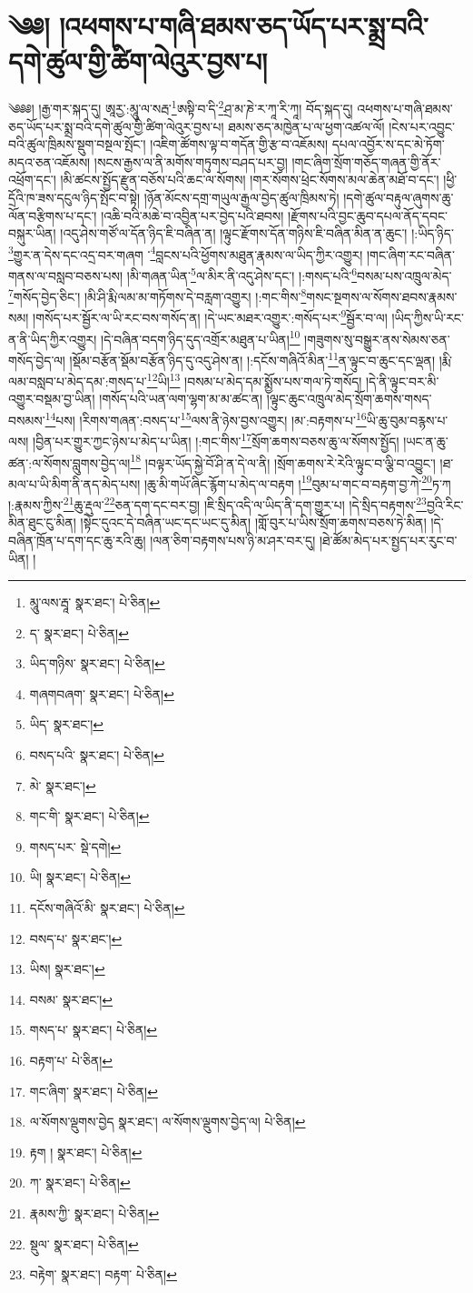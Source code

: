 \setcounter{footnote}{0} 
\chapter{༄༅། །འཕགས་པ་གཞི་ཐམས་ཅད་ཡོད་པར་སྨྲ་བའི་དགེ་ཚུལ་གྱི་ཚིག་ལེའུར་བྱས་པ།}༄༅༅། །རྒྱ་གར་སྐད་དུ། ཨཱརྱ་:མཱུ་ལ་སརྦ་\footnote{མཱུ་ལས་རྦཱ་  སྣར་ཐང་།  པེ་ཅིན། }ཨསྟི་བ་དི་\footnote{ད་  སྣར་ཐང་།  པེ་ཅིན། }ཤྲ་མ་ཎེ་ར་ཀཱ་རི་ཀཱ། བོད་སྐད་དུ། འཕགས་པ་གཞི་ཐམས་ཅད་ཡོད་པར་སྨྲ་བའི་དགེ་ཚུལ་གྱི་ཚིག་ལེའུར་བྱས་པ། ཐམས་ཅད་མཁྱེན་པ་ལ་ཕྱག་འཚལ་ལོ། །ངེས་པར་འབྱུང་བའི་ཚུལ་ཁྲིམས་སྡུག་བསྔལ་སྤོང་། །འཇིག་ཚོགས་ལྟ་བ་གདོན་གྱི་རྩ་བ་འཇོམས། དཔལ་འབྱོར་ས་དང་མེ་ཏོག་མདའ་ཅན་འཇོམས། །སངས་རྒྱས་ལ་ནི་མགོས་གཏུགས་བཤད་པར་བྱ། །གང་ཞིག་སྲོག་གཅོད་གཞན་གྱི་ནོར་འཕྲོག་དང་། །མི་ཚངས་སྤྱོད་རྫུན་བཅོས་པའི་ཆང་ལ་སོགས། །གར་སོགས་ཕྲེང་སོགས་མལ་ཆེན་མཐོ་བ་དང་། །ཕྱི་དྲོའི་ཁ་ཟས་དངུལ་ཉིད་སྤོང་བ་སྟེ། །ཉོན་མོངས་དགྲ་གཡུལ་རྒྱལ་བྱེད་ཚུལ་ཁྲིམས་ཏེ། །དགེ་ཚུལ་བརྟུལ་ཞུགས་ཆུ་ལོན་བརྩིགས་པ་དང་། །འཆི་བའི་མཆེ་བ་འབྱིན་པར་བྱེད་པའི་ཐབས། །རྫོགས་པའི་བྱང་ཆུབ་དཔལ་ནོད་དབང་བསྐུར་ཡིན། །འདུ་ཤེས་གཙོ་ལ་དོན་ཉིད་ཇི་བཞིན་ན། །ལྟུང་རྫོགས་དོན་གཉིས་ཇི་བཞིན་མིན་ན་ཆུང་། །:ཡིད་ཉིད་\footnote{ཡིད་གཉིས་  སྣར་ཐང་།  པེ་ཅིན། }གྱུར་ན་དེས་དང་འདྲ་བར་གཞག ་\footnote{གཞགབཞག་  སྣར་ཐང་།  པེ་ཅིན། }བླངས་པའི་ཕྱོགས་མཐུན་རྣམས་ལ་ཡིད་ཀྱིར་འགྱུར། །གང་ཞིག་རང་བཞིན་གནས་ལ་བསླབ་བཅས་པས། །མི་གཞན་ཡིན་\footnote{ཡིད་  སྣར་ཐང་། }ལ་མིར་ནི་འདུ་ཤེས་དང་། །:གསད་པའི་\footnote{བསད་པའི་  སྣར་ཐང་།  པེ་ཅིན། }བསམ་པས་འཁྲུལ་མེད་\footnote{མེ་  སྣར་ཐང་། }གསོད་བྱེད་ཅིང་། །མི་ཤི་རྨི་ལམ་མ་གཏོགས་དེ་བརླག་འགྱུར། །:གང་གིས་\footnote{གང་གི་  སྣར་ཐང་།  པེ་ཅིན། }གསང་སྔགས་ལ་སོགས་ཐབས་རྣམས་སམ། །གསོད་པར་སྦྱོར་ལ་ཡི་རང་བས་གསོད་ན། །དེ་ཡང་མཐར་འགྱུར་:གསོད་པར་\footnote{གསད་པར་  སྡེ་དགེ། }སྦྱོར་བ་ལ། །ཡིད་ཀྱིས་ཡི་རང་ན་ནི་ཡིད་ཀྱིར་འགྱུར། །དེ་བཞིན་བདག་ཉིད་དུད་འགྲོར་མཐུན་པ་ཡིན།\footnote{ཡི།  སྣར་ཐང་།  པེ་ཅིན། } །གཟུགས་སུ་བསྒྱུར་ནས་སེམས་ཅན་གསོད་བྱེད་ལ། །སྡོམ་བརྩོན་སྡོམ་བརྩོན་ཉིད་དུ་འདུ་ཤེས་ན། །:དངོས་གཞིའོ་མིན་\footnote{དངོས་གཞིའོ་མི་  སྣར་ཐང་།  པེ་ཅིན། }ན་ལྟུང་བ་ཆུང་དང་ལྡན། །རྨི་ལམ་བསླབ་པ་མེད་དམ་:གསད་པ་\footnote{བསད་པ་  སྣར་ཐང་། }ཡི།\footnote{ཡིས།  སྣར་ཐང་། } །བསམ་པ་མེད་དམ་སྨྱོས་པས་གལ་ཏེ་གསོད། །དེ་ནི་ལྟུང་བར་མི་འགྱུར་བསྡམ་བྱ་ཡིན། །གསོད་པའི་ཡན་ལག་ལྷག་མ་མ་ཚང་ན། །ལྟུང་ཆུང་འཁྲུལ་མེད་སྲོག་ཆགས་གསད་བསམས་\footnote{བསམ་  སྣར་ཐང་། }པས། །རིགས་གཞན་:བསད་པ་\footnote{གསད་པ་  སྣར་ཐང་།  པེ་ཅིན། }ལས་ནི་ཉེས་བྱས་འགྱུར། །མ་:བརྟགས་པ་\footnote{བརྟག་པ་  པེ་ཅིན། }ཡི་ཆུ་བུམ་བརྙས་པ་ལས། །བྱིན་པར་གྱུར་ཀྱང་ཉེས་པ་མེད་པ་ཡིན། །:གང་གིས་\footnote{གང་ཞིག་  སྣར་ཐང་།  པེ་ཅིན། }སྲོག་ཆགས་བཅས་ཆུ་ལ་སོགས་སྤྱོད། །ཡང་ན་ཆུ་ཚན་:ལ་སོགས་བླུགས་བྱེད་ལ།\footnote{ལ་སོགས་ལྡུགས་བྱེད  སྣར་ཐང་། ལ་སོགས་ལྡུགས་བྱེད་ལ།  པེ་ཅིན། } །བལྟར་ཡོད་སྐྱེ་བོ་ཤི་ན་དེ་ལ་ནི། །སྲོག་ཆགས་རེ་རེའི་ལྟུང་བ་ལྕི་བ་འབྱུང་། །ཐ་མལ་པ་ཡི་མིག་ནི་ནད་མེད་པས། །ཆུ་མི་གཡོ་ཞིང་རྙོག་པ་མེད་ལ་བརྟག །\footnote{རྟག །  སྣར་ཐང་།  པེ་ཅིན། }བུམ་པ་གང་བ་བརྟག་བྱ་ཀེ་\footnote{ཀ་  སྣར་ཐང་།  པེ་ཅིན། }ཏ་ཀ །:རྣམས་ཀྱིས་\footnote{རྣམས་ཀྱི་  སྣར་ཐང་།  པེ་ཅིན། }ཆུ་རྡུལ་\footnote{སྡུལ་  སྣར་ཐང་།  པེ་ཅིན། }ཅན་དག་དང་བར་བྱ། །ཇི་སྲིད་འདི་ལ་ཡིད་ནི་དག་གྱུར་པ། །དེ་སྲིད་བརྟགས་\footnote{བརྟེག་  སྣར་ཐང་། བརྟག་  པེ་ཅིན། }བྱའི་རིང་མིན་ཐུང་ངུ་མིན། །སྟེང་དུའང་དེ་བཞིན་ཡང་དང་ཡང་དུ་མིན། །གློ་བུར་པ་ཡིས་སྲོག་ཆགས་བཅས་ཏེ་མིན། །དེ་བཞིན་ཁྲོན་པ་དག་དང་ཆུ་རའི་ཆུ། །ལན་ཅིག་བརྟགས་པས་ཉི་མ་ཤར་བར་དུ། །ཐེ་ཚོམ་མེད་པར་སྤྱད་པར་རུང་བ་ཡིན། །
